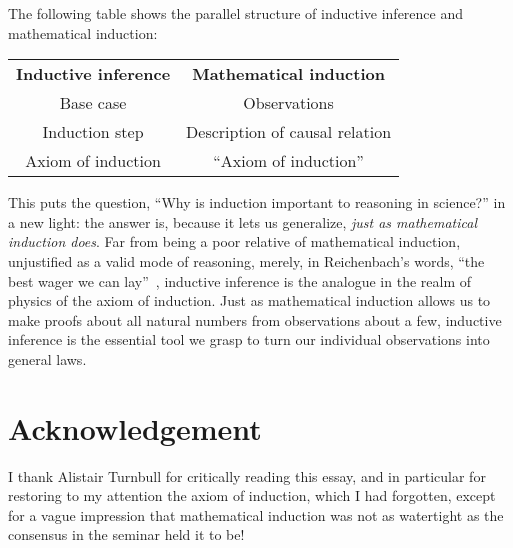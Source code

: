 \documentclass[english]{scrartcl}
\begin{document}
The following table shows the parallel structure of inductive inference and mathematical induction:

\begin{center}
  \begin{tabular}{cc}
    \textbf{Inductive inference} & \textbf{Mathematical induction}\\
    Base case & Observations\\
    Induction step & Description of causal relation\\
    Axiom of induction & “Axiom of induction”\\
  \end{tabular}
\end{center}

This puts the question, “Why is induction important to reasoning in science?” in a new light: the answer is, because it lets us generalize, \emph{just as mathematical induction does}. Far from being a poor relative of mathematical induction, unjustified as a valid mode of reasoning, merely, in Reichenbach’s words, “the best wager we can lay”~\cite{reichenbach1938eap}, inductive inference is the analogue in the realm of physics of the axiom of induction. Just as mathematical induction allows us to make proofs about all natural numbers from observations about a few, inductive inference is the essential tool we grasp to turn our individual observations into general laws.




 \section*{Acknowledgement}

I thank Alistair Turnbull for critically reading this essay, and in particular for restoring to my attention the axiom of induction, which I had forgotten, except for a vague impression that mathematical induction was not as watertight as the consensus in the seminar held it to be!
\end{document}
